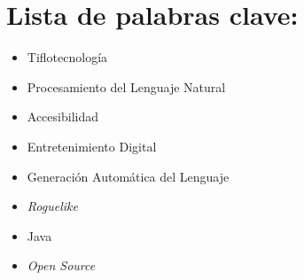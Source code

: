 \section*{Lista de palabras clave:}

\begin{itemize}
  \item Tiflotecnología
  \item Procesamiento del Lenguaje Natural
  \item Accesibilidad
  \item Entretenimiento Digital
	\item Generación Automática del Lenguaje
	\item \textit{Roguelike}
  \item Java
  \item \textit{Open Source}
\end{itemize}
